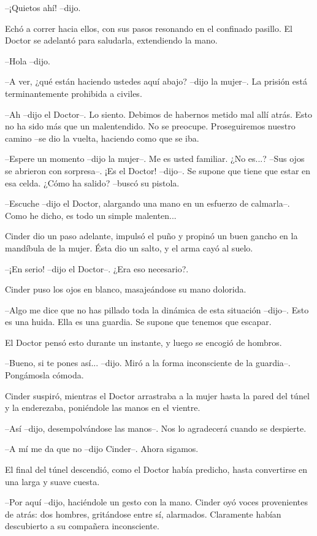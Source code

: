 --¡Quietos ahí! --dijo.

Echó a correr hacia ellos, con sus pasos resonando en el confinado pasillo. El Doctor se adelantó para saludarla, extendiendo la mano.

--Hola --dijo.

--A ver, ¿qué están haciendo ustedes aquí abajo? --dijo la mujer--. La prisión está terminantemente prohibida a civiles.

--Ah --dijo el Doctor--. Lo siento. Debimos de habernos metido mal allí atrás. Esto no ha sido más que un malentendido. No se preocupe. Proseguiremos nuestro camino --se dio la vuelta, haciendo como que se iba.

--Espere un momento --dijo la mujer--. Me es usted familiar. ¿No es...? --Sus ojos se abrieron con sorpresa--. ¡Es el Doctor! --dijo--. Se supone que tiene que estar en esa celda. ¿Cómo ha salido? --buscó su pistola.

--Escuche --dijo el Doctor, alargando una mano en un esfuerzo de calmarla--. Como he dicho, es todo un simple malenten...

Cinder dio un paso adelante, impulsó el puño y propinó un buen gancho en la mandíbula de la mujer. Ésta dio un salto, y el arma cayó al suelo.

--¡En serio! --dijo el Doctor--. ¿Era eso necesario?.

Cinder puso los ojos en blanco, masajeándose su mano dolorida.

--Algo me dice que no has pillado toda la dinámica de esta situación --dijo--. Esto es una huida. Ella es una guardia. Se supone que tenemos que escapar.

El Doctor pensó esto durante un instante, y luego se encogió de hombros.

--Bueno, si te pones así... --dijo. Miró a la forma inconsciente de la guardia--. Pongámosla cómoda.

Cinder suspiró, mientras el Doctor arrastraba a la mujer hasta la pared del túnel y la enderezaba, poniéndole las manos en el vientre.

--Así --dijo, desempolvándose las manos--. Nos lo agradecerá cuando se despierte.

--A mí me da que no --dijo Cinder--. Ahora sigamos.

El final del túnel descendió, como el Doctor había predicho, hasta convertirse en una larga y suave cuesta. 

--Por aquí --dijo, haciéndole un gesto con la mano.
Cinder oyó voces provenientes de atrás: dos hombres, gritándose entre sí, alarmados. Claramente habían descubierto a su compañera inconsciente.

